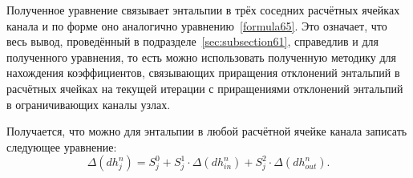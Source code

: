Полученное уравнение связывает энтальпии в трёх соседних расчётных ячейках канала и по форме оно аналогично уравнению~\eqref{formula65}. Это означает, что весь вывод, проведённый в подразделе~\ref{sec:subsection61}, справедлив и для полученного уравнения, то есть можно использовать полученную методику для нахождения коэффициентов, связывающих приращения отклонений энтальпий в расчётных ячейках на текущей итерации с приращениями отклонений энтальпий в ограничивающих каналы узлах. 

Получается, что можно для энтальпии в любой расчётной ячейке канала записать следующее уравнение:
\begin{equation}
\label{formula76}
\Delta(dh_j^n)=S_j^0+S_j^1 \cdot \Delta(dh_{in}^n) + S_j^2 \cdot \Delta(dh_{out}^n).
\end{equation}



